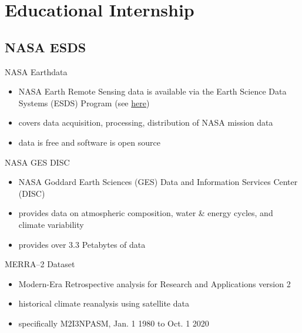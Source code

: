 \documentclass[../00_main.tex]{subfiles}
\begin{document}
\section{Educational Internship}

\subsection{NASA ESDS}

\begin{frame}{NASA Earthdata}
    \begin{itemize}
        \item NASA Earth Remote Sensing data is available via the Earth Science 
            Data Systems (ESDS) Program (see 
            \href{https://earthdata.nasa.gov/esds}{here})
        \item covers data acquisition, processing, distribution of NASA 
            mission data
        \item data is free and software is open source \cite{esds-website}
    \end{itemize}
\end{frame}

\begin{frame}{NASA GES DISC}
    \begin{itemize}
        \item NASA Goddard Earth Sciences (GES) Data and Information 
            Services Center (DISC) 
        \item provides data on atmospheric composition, water \& energy cycles, 
            and climate variability \cite{gesdisc-about}
        \item provides over 3.3 Petabytes of data \cite{gesdisc-main} 
    \end{itemize}
\end{frame}

\begin{frame}{MERRA--2 Dataset}
    \begin{itemize}
        \item Modern-Era Retrospective analysis for Research and 
            Applications version 2 
        \item historical climate reanalysis using satellite data
        \item specifically M2I3NPASM, Jan. 1 1980 to Oct. 1 2020
    \end{itemize}
\end{frame}
\end{document}
